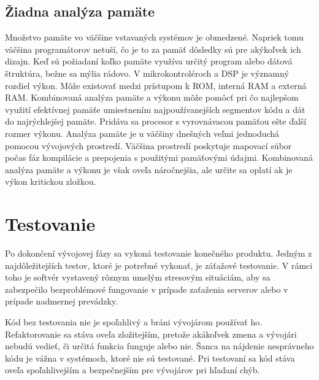 \documentclass[10pt,twoside,slovak,a4paper]{article}
\begin{document}
\subsection{Žiadna analýza pamäte}
\cite{25mistakes}
Množstvo pamäte vo väčšine vstavaných systémov je obmedzené. Napriek tomu väčšina programátorov netuší, čo je to za pamäť
dôsledky sú pre akýkoľvek ich dizajn. Keď sú požiadaní koľko pamäte využíva určitý program alebo dátová štruktúra, bežne sa mýlia rádovo.
V mikrokontroléroch a DSP je významný rozdiel výkon. Môže existovať medzi prístupom k ROM, interná
RAM a externá RAM. Kombinovaná analýza pamäte a výkonu môže pomôcť pri čo najlepšom využití efektívnej pamäťe umiestnením najpoužívanejších segmentov kódu a dát do najrýchlejšej pamäte. Pridáva sa procesor s vyrovnávacou pamäťou ešte ďalší rozmer výkonu.
Analýza pamäte je u väčšiny dnešných veľmi jednoduchá pomocou vývojových prostredí. Väčšina prostredí poskytuje mapovací súbor počas fáz kompilácie a prepojenia s použitými pamäťovými údajmi. Kombinovaná analýza pamäte a výkonu je však oveľa náročnejšia, ale určite sa oplatí ak je 
výkon kritickou zložkou.










\section{Testovanie}
Po dokončení vývojovej fázy sa vykoná testovanie konečného produktu. Jedným z najdôležitejších testov, ktoré je potrebné vykonať, je záťažové testovanie. V rámci toho je softvér vystavený rôznym umelým stresovým situáciám, aby sa zabezpečilo bezproblémové fungovanie v prípade zaťaženia serverov alebo v prípade nadmernej prevádzky.

Kód bez testovania nie je spoľahlivý a bráni vývojárom používať ho. Refaktorovanie sa stáva oveľa zložitejším, pretože akákoľvek zmena a vývojári nebudú vedieť, či určitá funkcia funguje alebo nie. Šanca na nájdenie nesprávneho kódu je vážna v systémoch, ktoré nie sú testované. Pri testovaní sa kód stáva oveľa spoľahlivejším a bezpečnejším pre vývojárov pri hľadaní chýb.
\end{document}
